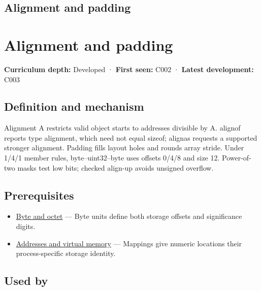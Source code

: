 \hypertarget{appendix-a1f7c53b4742}{}
\section*{Alignment and padding}
\chapter{Alignment and padding}\label{appendix-a1f7c53b4742-alignment-and-padding}

\textbf{Curriculum depth:} Developed · \textbf{First seen:} C002 · \textbf{Latest development:} C003

\section{Definition and mechanism}\label{appendix-a1f7c53b4742-definition-and-mechanism}

Alignment A restricts valid object starts to addresses divisible by A. alignof reports type alignment, which need not equal sizeof; alignas requests a supported stronger alignment. Padding fills layout holes and rounds array stride. Under 1/4/1 member rules, byte--uint32--byte uses offsets 0/4/8 and size 12. Power-of-two masks test low bits; checked align-up avoids unsigned overflow.

\section{Prerequisites}\label{appendix-a1f7c53b4742-prerequisites}

\begin{itemize}
\tightlist
\item
  \hyperref[appendix-5bee2df85484]{Byte and octet} --- Byte units define both storage offsets and significance digits.
\item
  \hyperref[appendix-18ee4f913c3c]{Addresses and virtual memory} --- Mappings give numeric locations their process-specific storage identity.
\end{itemize}

\section{Used by}\label{appendix-a1f7c53b4742-used-by}

